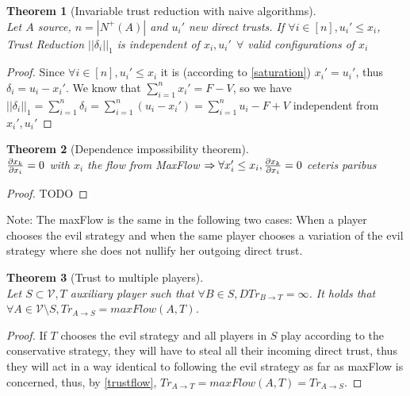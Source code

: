 \documentclass[11pt]{article}
\newtheorem{theorem}{Theorem}[section]
\theoremstyle{definition}
\theoremstyle{corollary}
\theoremstyle{lemma}
\begin{document}
    \begin{theorem}[Invariable trust reduction with naive algorithms] \ \\
       \label{invariability}
       Let $A$ source, $n = |N^{+}(A)|$ and $u_i'$ new direct trusts. If $\forall i \in [n],u_i' \leq x_i$,
       Trust Reduction $||\delta_i||_1$ is independent of $x_i, u_i' \:\: \forall$ valid configurations of $x_i$
    \end{theorem}
    \begin{proof} 
       Since $\forall i \in [n],u_i' \leq x_i$ it is (according to \ref{saturation}) $x_i' = u_i'$, thus
       $\delta_i = u_i - x_i'$. We know that $\sum\limits_{i=1}^{n}x_i' = F - V$, so we have $||\delta_i||_1 =
       \sum\limits_{i=1}^{n}\delta_i = \sum\limits_{i=1}^{n}(u_i - x_i') = \sum\limits_{i=1}^{n}u_i - F + V$ independent
       from $x_i', u_i'$
    \end{proof}

    \begin{theorem}[Dependence impossibility theorem] \ \\
       \label{independence}
       ${\partial x_k \over \partial x_i} = 0$ with $x_i$ the flow from MaxFlow $\Rightarrow
         \forall x_i' \leq x_i, {\partial x_k \over \partial x_i} = 0$ ceteris paribus
    \end{theorem}
    \begin{proof}
       TODO
    \end{proof}
    Note: The maxFlow is the same in the following two cases: When a player chooses the evil strategy and when the same
    player chooses a variation of the evil strategy where she does not nullify her outgoing direct trust.

    \begin{theorem}[Trust to multiple players] \ \\
       \label{trustmany}
       Let $S \subset \mathcal{V}, T$ auxiliary player such that $\forall B \in S, DTr_{B \rightarrow T} = \infty$.
       It holds that $\forall A \in \mathcal{V} \setminus S, Tr_{A \rightarrow S} = maxFlow(A, T)$.
    \end{theorem}       
    \begin{proof}
       If $T$ chooses the evil strategy and all players in $S$ play according to the conservative strategy, they will have to steal
       all their incoming direct trust, thus they will act in a way identical to following the evil strategy as far as
       maxFlow is concerned, thus, by \ref{trustflow}, $Tr_{A \rightarrow T} = maxFlow(A, T) = Tr_{A \rightarrow S}$.
    \end{proof}
\end{document}
